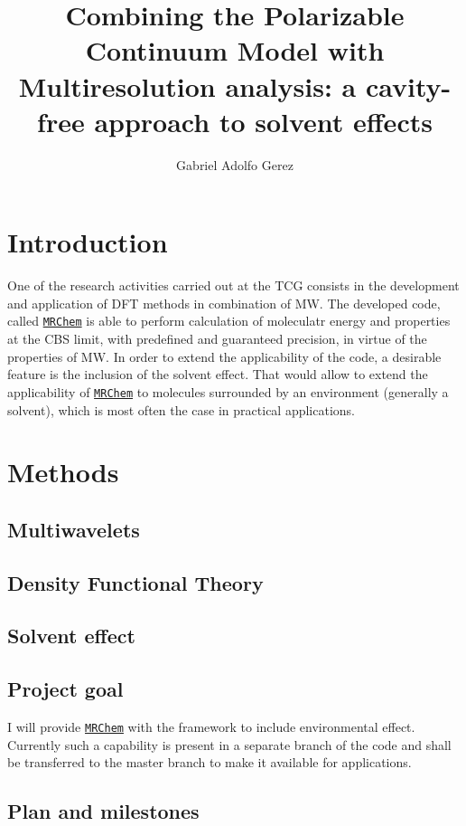 \documentclass[a4paper,11pt]{article}
\title{Combining the Polarizable Continuum Model with Multiresolution
  analysis: a cavity-free approach to solvent effects}
\author{Gabriel Adolfo Gerez}
\newcommand{\mrchem}{\href{https://mrchem.readthedocs.io/en/latest/}{\texttt{MRChem}}}
\begin{document}
\maketitle

\section{Introduction}

One of the research activities carried out at the \ac{TCG} consists in
the development and application of \ac{DFT} methods in combination of
\ac{MW}. The developed code, called \mrchem{} is able to perform calculation of
moleculatr energy and properties at the \ac{CBS} limit, with
predefined and guaranteed precision, in virtue of the properties of
\ac{MW}. In order to extend the applicability of the code, a desirable
feature is the inclusion of the solvent effect. That would allow to
extend the applicability of \mrchem{} to molecules surrounded by an
environment (generally a solvent), which is most often the case in
practical applications.

\section{Methods}

\subsection{Multiwavelets}

\subsection{Density Functional Theory}

\subsection{Solvent effect}

\subsection{Project goal}

I will provide \mrchem{} with the
framework to include environmental effect. Currently such a capability
is present in a separate branch of the code and shall be transferred
to the master branch to make it available for applications.

\subsection{Plan and milestones}
\end{document}
